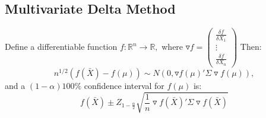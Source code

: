\documentclass[12pt]{article}\usepackage{graphicx, color}
\theoremstyle{definition}
\begin{document}
\subsection{Multivariate Delta Method}
Define a differentiable function $f:\mathbb{R}^n\rightarrow \mathbb{R},$ where $\triangledown f =\begin{pmatrix}\frac{\delta f}{\delta X_1}\\ \vdots \\ \frac {\delta f}{\delta X_n}\end{pmatrix}$ Then:
$$n^{1/2}(f(\bar X)-f(\mu))\sim N(0, \triangledown f(\mu)' \Sigma \triangledown f (\mu)),$$ and a $(1-\alpha)100\%$ confidence interval for $f(\mu)$ is:
$$f(\bar X) \pm Z_{1-\frac{\alpha}{2}} \sqrt {\frac{1}{n} \triangledown f(\bar X)' \Sigma \triangledown f (\bar X)}$$
\end{document}

